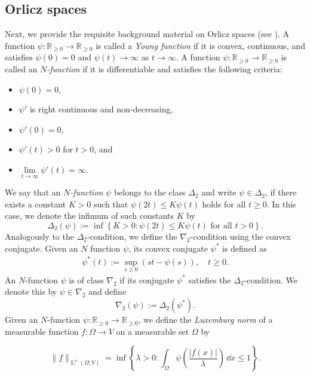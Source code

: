 \documentclass[a4paper,11pt]{amsart}
\numberwithin{equation}{section}
\newcommand{\R}{\mathbb{R}}
\newcommand{\lebe}{\operatorname{L}}
\begin{document}
	\subsection{Orlicz spaces}
	Next, we provide the requisite background material on Orlicz spaces (see \cite{adams_sobolev, ren_theory_1991}). A function $\psi: \mathbb{R}_{\geq 0} \to \mathbb{R}_{\geq 0}$ is called a \emph{Young function} if it is convex, continuous, and satisfies $\psi(0) = 0$ and $\psi(t) \to \infty$ as $t \to \infty$.
	A function $\psi: \mathbb{R}_{\geq 0} \to \mathbb{R}_{\geq 0}$ is called an \emph{$N$-function} if it is differentiable and satisfies the following criteria:
	\begin{itemize}
		\item $\psi(0) = 0$,
		\item $\psi'$ is right continuous and non-decreasing,
		\item $\psi'(0) = 0$,
		\item $\psi'(t) > 0$ for $t > 0$, and
		\item $\lim \limits_{t \to \infty} \psi'(t) = \infty$.
	\end{itemize}
	\noindent
	We say that an \emph{$N$-function} $\psi$ belongs to the class $\Delta_2$ and write $\psi \in \Delta_2$, if there exists a constant $K > 0$ such that $\psi(2t) \leq K \psi(t)$ holds for all $t \geq 0$. In this case, we denote the infimum of such constants $K$ by
	\[
	\Delta_2(\psi) := \inf \left\{ K > 0 : \psi(2t) \leq K \psi(t) \text{ for all } t > 0 \right\}.
	\]
	Analogously to the $\Delta_2$-condition, we define the $\nabla_2$-condition using the {convex} conjugate. Given an $N$ function $\psi$, its {convex conjugate} $\psi^*$ is defined as
	\begin{align}\label{eq:Fenchel}
		\psi^*(t) := \sup_{s \geq 0} (st - \psi(s)), \quad t \geq 0.
	\end{align}
	An $N$-function $\psi$ is of class $\nabla_2$ if its conjugate $\psi^*$ satisfies the $\Delta_2$-condition. We denote this by $\psi \in \nabla_2$ and define
	\[
	\nabla_2(\psi) := \Delta_2(\psi^*).
	\]
	Given an $N$-function $\psi: \R_{\geq 0} \rightarrow \R_{\geq 0}$, we define the \emph{Luxemburg norm} of a measurable function $f: \Omega \to V$ on a measurable set $\Omega$ by
	
	\begin{equation*}
		\|f\|_{\lebe^\psi(\Omega; V)} = \inf \left\{ \lambda > 0 : \int_{\Omega} \psi \left(\frac{|f(x)|}{\lambda}\right) \,\dd{x} \leq 1 \right\}.
	\end{equation*}
	
\end{document}

